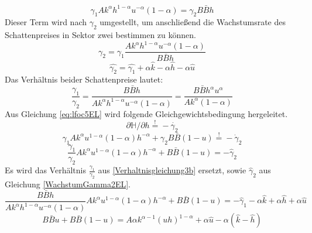 \begin{equation}
\gamma_{1}Ak^{\alpha}h^{1- \alpha}u^{- \alpha} (1- \alpha) = \gamma_{2} B \bar{B} h 
\label{foc4}
\end{equation}
Dieser Term wird nach $\gamma_2$ umgestellt, um anschlie{\ss}end die Wachstumsrate des Schattenpreises in Sektor zwei bestimmen zu können.
\begin{equation}
\gamma_{2} = \gamma_{1} \frac{Ak^{\alpha}h^{1- \alpha} u^{- \alpha} (1- \alpha)} {B \bar{B} h} 
\end{equation}
\vspace{-0.5cm}
\begin{equation}
\hat{\gamma_{2}} = \hat{\gamma_{1}} + \alpha \hat{k} - \alpha \hat{h} - \alpha \hat{u}\label{WachstumGamma2EL}
\end{equation}
Das Verhältnis beider Schattenpreise lautet:
\begin{equation}
\frac{\gamma_{1}}{\gamma_{2}}= \frac{B \bar{B} h}{A k^{\alpha} h^{1- \alpha} u^{- \alpha} (1- \alpha)} = \frac{B \bar{B} h^{\alpha} u^{\alpha}} {A k^{\alpha} (1- \alpha)}
\label{Verhaltnisgleichung3b}
\end{equation}
Aus Gleichung \eqref{eq:lfoc5EL} wird folgende Gleichgewichtsbedingung hergeleitet.
\begin{equation}
\partial\mathbb{H}/\partial h\overset{!}{=}-\dot{\gamma_2}
\end{equation}
\begin{equation}
\gamma_{1} A k^{\alpha} u^{1- \alpha} (1- \alpha) h^{- \alpha} + \gamma_{2} B \bar{B} (1- u) \overset{!}{=} - \dot{\gamma}_{2}
\end{equation}
\begin{equation}
\frac{\gamma_{1}}{\gamma_{2}} A k^{\alpha} u^{1- \alpha} (1- \alpha) h^{- \alpha} + B \bar{B} (1- u) = - \hat{\gamma}_{2}
\end{equation}
Es wird das Verhältnis $\frac{\gamma_1}{\gamma_2}$ aus \eqref{Verhaltnisgleichung3b} ersetzt, sowie $\hat{\gamma}_2$ aus Gleichung \eqref{WachstumGamma2EL}.
\begin{equation*}
\frac{B \bar{B} h}{A k^{\alpha} h^{1 - \alpha}u^{- \alpha} (1- \alpha) } A k^{\alpha} u^{1- \alpha} (1- \alpha) h^{- \alpha} + B \bar{B} (1- u) = - \hat{\gamma}_{1} - \alpha \hat{k} + \alpha \hat{h} + \alpha \hat{u}
\end{equation*}
\begin{equation}
B \bar{B} u + B \bar{B} (1- u) = A \alpha k^{\alpha -1} (uh)^{1- \alpha} + \alpha \hat{u} - \alpha (\hat{k} - \hat{h}) 
\end{equation}
